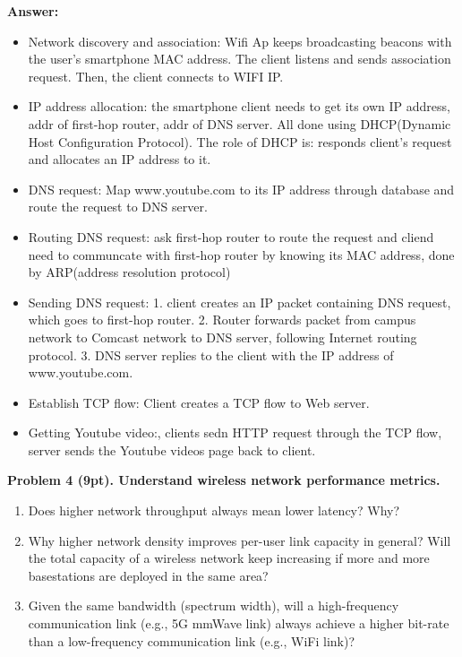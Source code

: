 \documentclass[12pt]{article}
\begin{document}
\textbf{Answer:}
\begin{itemize}
    \item Network discovery and association: Wifi Ap keeps broadcasting beacons with the user's smartphone MAC address. The client listens and sends association request. Then, the client connects to WIFI IP.
    \item IP address allocation: the smartphone client needs to get its own IP address, addr of first-hop router, addr of DNS server. All done using DHCP(Dynamic Host Configuration Protocol). The role of DHCP is: responds client's request and allocates an IP address to it.
    \item DNS request: Map www.youtube.com to its IP address through database and route the request to DNS server.
    \item Routing DNS request: ask first-hop router to route the request and cliend need to communcate with first-hop router by knowing its MAC address, done by ARP(address resolution protocol)
    \item Sending DNS request: 1. client creates an IP packet containing DNS request, which goes to first-hop router. 2. Router forwards packet from campus network to Comcast network to DNS server, following Internet routing protocol. 3. DNS server replies to the client with the IP address of www.youtube.com.
    \item Establish TCP flow: Client creates a TCP flow to Web server.
    \item Getting Youtube video:, clients sedn HTTP request through the TCP flow, server sends the Youtube videos page back to client.\\
\end{itemize}




\noindent \textbf{Problem 4 (9pt). Understand wireless network performance metrics.\\}
\begin{enumerate}
        \item Does higher network throughput always mean lower latency? Why?
        \item Why higher network density improves per-user link capacity in general? Will the total
capacity of a wireless network keep increasing if more and more basestations are
deployed in the same area?
        \item Given the same bandwidth (spectrum width), will a high-frequency communication link
(e.g., 5G mmWave link) always achieve a higher bit-rate than a low-frequency
communication link (e.g., WiFi link)?
\end{enumerate}
\end{document}

